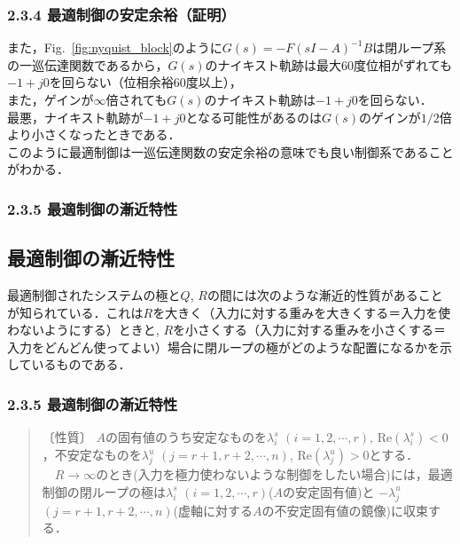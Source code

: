\begin{frame}[t]
\frametitle{2.3.4 最適制御の安定余裕（証明）}
また，Fig.~\ref{fig:nyquist_block}のように$G(s)= - F (sI - A)^{-1} B$は閉ループ系の一巡伝達関数であるから，$G(s)$のナイキスト軌跡は最大60度位相がずれても$-1+j0$を回らない（位相余裕60度以上），
\\[3mm]

また，ゲインが$\infty$倍されても$G(s)$のナイキスト軌跡は$-1+j0$を回らない．
\\[3mm]

最悪，ナイキスト軌跡が$-1+j0$となる可能性があるのは$G(s)$のゲインが$1/2$倍より小さくなったときである．
\\[3mm]

このように最適制御は一巡伝達関数の安定余裕の意味でも良い制御系であることがわかる．

\end{frame}

\begin{frame}[t]
\frametitle{2.3.5 最適制御の漸近特性}

\subsection{最適制御の漸近特性}

最適制御されたシステムの極と$Q$, $R$の間には次のような漸近的性質があることが知られている．これは$R$を大きく（入力に対する重みを大きくする＝入力を使わないようにする）ときと, $R$を小さくする（入力に対する重みを小さくする＝入力をどんどん使ってよい）場合に閉ループの極がどのような配置になるかを示しているものである．
\end{frame}

\begin{frame}[t]
\frametitle{2.3.5 最適制御の漸近特性}

\begin{quote}
〔性質〕 $A$の固有値のうち安定なものを$\lambda^s_i$ $(i=1,2,\cdots,r)$, $\mbox{Re}(\lambda^s_i) < 0$，不安定なものを$\lambda^u_j$ $(j=r+1,r+2,\cdots,n)$, $\mbox{Re}(\lambda^u_j) > 0$とする．
\\{}
\ \ 
$R \rightarrow \infty$のとき(入力を極力使わないような制御をしたい場合)には，最適制御の閉ループの極は$\lambda^s_i$ $(i=1,2,\cdots,r)$($A$の安定固有値)と $-\lambda^u_j$ $(j=r+1,r+2,\cdots,n)$(虚軸に対する$A$の不安定固有値の鏡像)に収束する．

\end{quote}

\end{frame}

